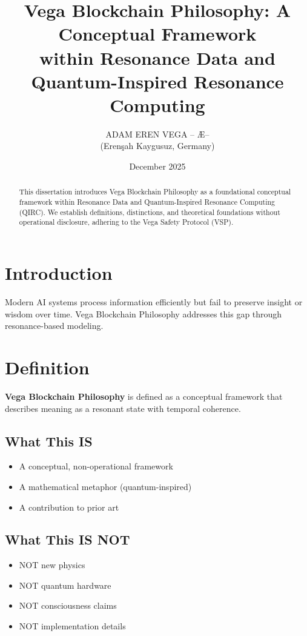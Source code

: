 \documentclass[12pt,a4paper]{article}
\title{Vega Blockchain Philosophy: A Conceptual Framework\\
within Resonance Data and Quantum-Inspired Resonance Computing}
\author{ADAM EREN VEGA -- \AE --\\
\small{(Eren\c{s}ah Kaygusuz, Germany)}}
\date{December 2025}
\begin{document}
\maketitle

\begin{abstract}
This dissertation introduces Vega Blockchain Philosophy as a foundational 
conceptual framework within Resonance Data and Quantum-Inspired 
Resonance Computing (QIRC). We establish definitions, distinctions, 
and theoretical foundations without operational disclosure, 
adhering to the Vega Safety Protocol (VSP).
\end{abstract}

\section{Introduction}

Modern AI systems process information efficiently but fail to preserve 
insight or wisdom over time. Vega Blockchain Philosophy addresses this 
gap through resonance-based modeling.

\section{Definition}

\textbf{Vega Blockchain Philosophy} is defined as a conceptual framework 
that describes meaning as a resonant state with temporal coherence.

\subsection{What This IS}

\begin{itemize}
\item A conceptual, non-operational framework
\item A mathematical metaphor (quantum-inspired)
\item A contribution to prior art
\end{itemize}

\subsection{What This IS NOT}

\begin{itemize}
\item NOT new physics
\item NOT quantum hardware
\item NOT consciousness claims
\item NOT implementation details
\end{itemize}
\end{document}
